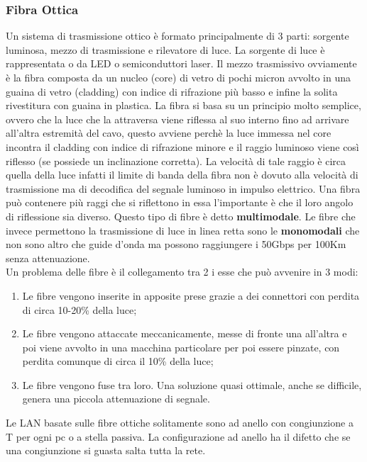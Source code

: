 \subsubsection{Fibra Ottica}

Un sistema di trasmissione ottico è formato principalmente di 3 parti: sorgente luminosa, mezzo di trasmissione e rilevatore di luce. La sorgente di luce è rappresentata o da LED o semiconduttori laser. Il mezzo trasmissivo ovviamente è la fibra composta da un nucleo (core) di vetro di pochi micron avvolto in una guaina di vetro (cladding) con indice di rifrazione più basso e infine la solita rivestitura con guaina in plastica. La fibra si basa su un principio molto semplice, ovvero che la luce che la attraversa viene riflessa al suo interno fino ad arrivare all'altra estremità del cavo, questo avviene perchè la luce immessa nel core incontra il cladding con indice di rifrazione minore e il raggio luminoso viene così riflesso (se possiede un inclinazione corretta). La velocità di tale raggio è circa quella della luce infatti il limite di banda della fibra non è dovuto alla velocità di trasmissione ma di decodifica del segnale luminoso in impulso elettrico. Una fibra può contenere più raggi che si riflettono in essa l'importante è che il loro angolo di riflessione sia diverso. Questo tipo di fibre è detto \textbf{multimodale}. Le fibre che invece permettono la trasmissione di luce in linea retta sono le \textbf{monomodali} che non sono altro che guide d'onda ma possono raggiungere i 50Gbps per 100Km senza attenuazione.\\ Un problema delle fibre è il collegamento tra 2 i esse che può avvenire in 3 modi:

\begin{enumerate}

\item{ Le fibre vengono inserite in apposite prese grazie a dei connettori con perdita di circa 10-20\% della luce};
\item{ Le fibre vengono attaccate meccanicamente, messe di fronte una all'altra e poi viene avvolto in una macchina particolare per poi essere pinzate, con perdita comunque di circa il 10\% della luce};
\item{ Le fibre vengono fuse tra loro. Una soluzione quasi ottimale, anche se difficile, genera una piccola attenuazione di segnale}.

\end{enumerate}

Le LAN basate sulle fibre ottiche solitamente sono ad anello con congiunzione a T per ogni pc o a stella passiva. La configurazione ad anello ha il difetto che se una congiunzione si guasta salta tutta la rete.

